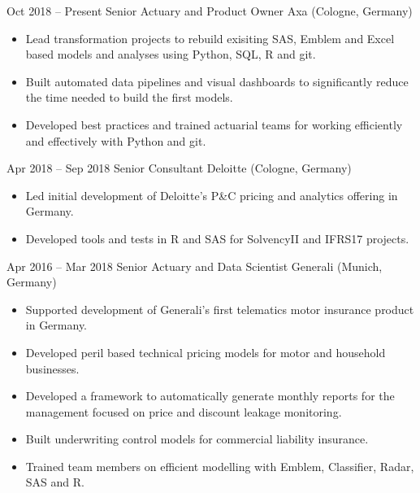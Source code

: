 \documentclass[a4paper,]{fortysecondscv}
\begin{document}
	\begin{cvtable}[4]

		\cvitem
			{Oct 2018 -- Present}
			{Senior Actuary and Product Owner}
			{Axa (Cologne, Germany)}
			{
				\vspace{-\topsep}
				\begin{itemize}[nosep, leftmargin=0pt] %
					\item Lead transformation projects to rebuild exisiting SAS, Emblem and Excel based models and analyses using Python, SQL, R and git.
					\item Built automated data pipelines and visual dashboards to significantly reduce the time needed to build the first models.
					\item Developed best practices and trained actuarial teams for working efficiently and effectively with Python and git.
				\end{itemize}
			}
		\cvitem
			{Apr 2018 -- Sep 2018}
			{Senior Consultant}
			{Deloitte (Cologne, Germany)}
			{
				\vspace{-\topsep}
				\begin{itemize}[nosep, leftmargin=0pt] %
  					\item Led initial development of Deloitte's P\&C pricing and analytics offering in Germany.
  					\item Developed tools and tests in R and SAS for SolvencyII and IFRS17 projects.
				\end{itemize}
			}
		\cvitem
			{Apr 2016 -- Mar 2018}
			{Senior Actuary and Data Scientist}
			{Generali (Munich, Germany)}
			{				
				\vspace{-\topsep}
				\begin{itemize}[nosep, leftmargin=0pt] %
					\item Supported development of Generali’s first telematics motor insurance product in Germany.
					\item Developed peril based technical pricing models for motor and household businesses.
					\item Developed a framework to automatically generate monthly reports for the management focused on price and discount leakage monitoring.
					\item Built underwriting control models for commercial liability insurance.
					\item Trained team members on efficient modelling with Emblem, Classifier, Radar, SAS and R.

\end{itemize}}
\end{cvtable}
\end{document}
